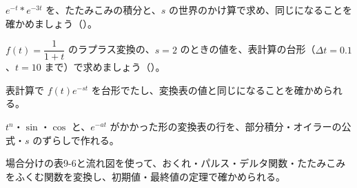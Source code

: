 \bkproblem $e^{-t}*e^{-3t}$ を、たたみこみの積分と、$s$ の世界のかけ算で求め、同じになることを確かめましょう\mbox{（）}。

\bkproblem $f(t)=\dfrac{1}{1+t}$ のラプラス変換の、$s=2$ のときの値を、表計算の台形（$\Delta t=0.1$、$t=10$ まで）で求めましょう\mbox{（）}。

\begin{furikaeri}
\begin{checklist}
\item 表計算で $f(t)e^{-st}$ を台形でたし、変換表の値と同じになることを確かめられる。
\item $t^n$・$\sin$・$\cos$ と、$e^{-at}$ がかかった形の変換表の行を、部分積分・オイラーの公式・$s$ のずらしで作れる。
\item 場合分けの表9-6と流れ図を使って、おくれ・パルス・デルタ関数・たたみこみをふくむ関数を変換し、初期値・最終値の定理で確かめられる。
\end{checklist}
\end{furikaeri}

